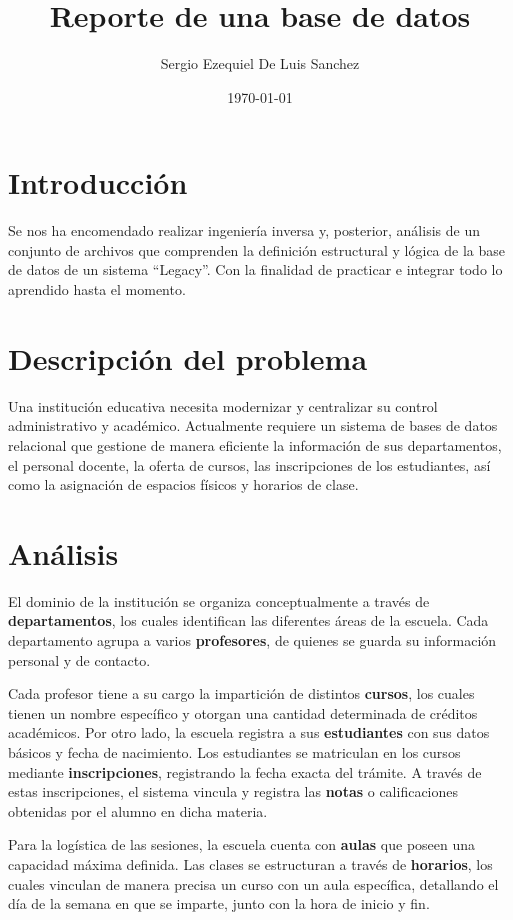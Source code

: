 \documentclass[12pt,letterpaper]{article}
\author{Sergio Ezequiel De Luis Sanchez}
\title{Reporte de una base de datos}
\date{\today}
\begin{document}
\maketitle
\tableofcontents
\listoffigures
\listoftables
\lstlistoflistings

\vspace{1cm}

\section{Introducción}
Se nos ha encomendado realizar ingeniería inversa y, posterior, análisis de un conjunto de archivos que comprenden la definición estructural y lógica de la base de datos de un sistema ``Legacy''. Con la finalidad de practicar e integrar todo lo aprendido hasta el momento.

\section{Descripción del problema}
Una institución educativa necesita modernizar y centralizar su control administrativo y académico. Actualmente requiere un sistema de bases de datos relacional que gestione de manera eficiente la información de sus departamentos, el personal docente, la oferta de cursos, las inscripciones de los estudiantes, así como la asignación de espacios físicos y horarios de clase.

\section{Análisis}
El dominio de la institución se organiza conceptualmente a través de \textbf{departamentos}, los cuales identifican las diferentes áreas de la escuela. Cada departamento agrupa a varios \textbf{profesores}, de quienes se guarda su información personal y de contacto. 

Cada profesor tiene a su cargo la impartición de distintos \textbf{cursos}, los cuales tienen un nombre específico y otorgan una cantidad determinada de créditos académicos. Por otro lado, la escuela registra a sus \textbf{estudiantes} con sus datos básicos y fecha de nacimiento. Los estudiantes se matriculan en los cursos mediante \textbf{inscripciones}, registrando la fecha exacta del trámite. A través de estas inscripciones, el sistema vincula y registra las \textbf{notas} o calificaciones obtenidas por el alumno en dicha materia.

Para la logística de las sesiones, la escuela cuenta con \textbf{aulas} que poseen una capacidad máxima definida. Las clases se estructuran a través de \textbf{horarios}, los cuales vinculan de manera precisa un curso con un aula específica, detallando el día de la semana en que se imparte, junto con la hora de inicio y fin.
\end{document}

